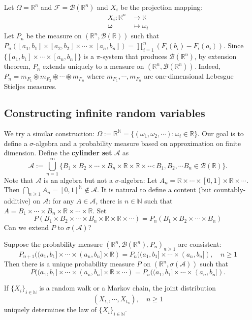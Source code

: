 \documentclass[11pt,singlecolumn, openany, citestyle=authoryear]{elegantbook}
\begin{document}
\begin{CJK}{UTF8}{gbsn}
Let $\Omega=\mathbb{R}^n$ and $\mathcal{F}=\mathcal{B}(\mathbb{R}^n)$ and $X_i$ be the projection mapping:
\begin{align*}
    X_i:\mathbb{R}^n&\longrightarrow\mathbb{R}\\
    \boldsymbol{\omega}&\longmapsto \omega_i
\end{align*}
Let $P_n$ be the measure on $(\mathbb{R}^n,\mathcal{B}(\mathbb{R}))$ such that 
$P_n([a_1,b_1]\times[a_2,b_2]\times\cdots\times [a_n,b_n])=\displaystyle \prod_{i=1}^n
(F_i(b_i)-F_i(a_i))$.
Since $\{[a_1,b_1]\times \cdots \times [a_n,b_n]\}$ is a $\pi$-system that produces 
$\mathcal{B}(\mathbb{R}^n)$, by extension theorem, $P_n$ extends uniquely to a measure 
on $(\mathbb{R}^n,\mathcal{B}(\mathbb{R}^n))$. Indeed, $P_n=m_{F_1}\circledast 
m_{F_2}\circledast \cdots \circledast m_{F_n}$ where $m_{F_1},\cdots,m_{F_n}$ are 
one-dimensional Lebesgue Stieljes measures.

\subsection*{Constructing infinite random variables}
We try a similar construction: $\Omega:=\mathbb{R}^\mathbb{N}=\{(\omega_1,\omega_2,\cdots):
\omega_i\in\mathbb{R}\}$. Our goal is to define a $\sigma$-algebra and a probability measure 
based on approximation on finite dimension. Define the \textbf{cylinder set} 
$\mathcal{A}$ as 
$$
\mathcal{A}:=\bigcup_{n=1}^\infty \{B_1\times B_2\times \cdots \times B_n \times 
\mathbb{R}\times \mathbb{R}\times\cdots:B_1,B_2,\cdots B_n \in \mathcal{B}(\mathbb{R})\}.
$$
Note that
$\mathcal{A}$ is an algebra but not a $\sigma$-algebra:
Let $A_n = \mathbb{R}\times\cdots\times[0,1]\times\mathbb{R}\times \cdots$. Then 
$\displaystyle\bigcap_{n\geqslant 1}A_n=[0,1]^{\mathbb{N}}\notin \mathcal{A}$.
It is natural to define a content (but countably-additive) on $\mathcal{A}$:
for any $A\in\mathcal{A}$, there is $n\in\mathbb{N}$ such that 
$A=B_1\times\cdots\times B_n\times \mathbb{R}\times\cdots\times \mathbb{R}$.
Set $$
P(B_1\times B_2\times \cdots \times B_n \times 
\mathbb{R}\times \mathbb{R}\times\cdots)=P_n(B_1\times B_2\times \cdots \times B_n)
$$
Can we extend $P$ to $\sigma(\mathcal{A})$?
\begin{theorem}
    Suppose the probability measure $(\mathbb{R}^n,\mathcal{B}(\mathbb{R}^n),P_n)_{n\geqslant1}$
    are consistent:
    $$
    P_{n+1}((a_1,b_1]\times\cdots\times(a_n,b_n]\times\mathbb{R})=
    P_n((a_1,b_1]\times\cdots\times(a_n,b_n]), \quad n\geqslant 1
    $$
    Then there is a unique probability measure $P$ on $(\mathbb{R}^n,\sigma(\mathcal{A}))$
    such that 
    $$
    P((a_1,b_1]\times\cdots\times(a_n,b_n]\times\mathbb{R}\times\cdots)=
    P_n((a_1,b_1]\times\cdots\times(a_n,b_n]).
    $$
\end{theorem}
\begin{example}
    If $\{X_i\}_{i\in\mathbb{N}}$ is a random walk or a Markov chain, the joint distribution 
    $$
    (X_{t_1},\cdots,X_{t_n}),\quad n \geqslant 1
    $$
    uniquely determines the law of $\{X_i\}_{i\in\mathbb{N}}$.
\end{example}


\end{CJK}
\end{document}
